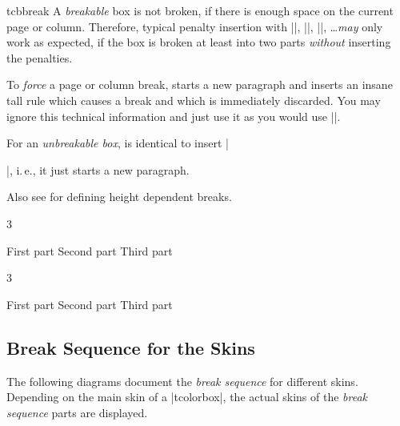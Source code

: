 \begin{docCommand}[doc new=2017-07-05]{tcbbreak}{}
  A \emph{breakable} box is not broken, if there is enough
  space on the current page or column.
  Therefore, typical penalty insertion with
  |\break|, |\pagebreak|, |\columnbreak|, \ldots \emph{may} only work as
  expected, if the box is broken at least into two parts
  \emph{without} inserting the penalties.\par\smallskip
  To \emph{force} a page or column break, 
  starts a new paragraph and inserts an insane tall rule which causes a
  break and which is immediately discarded. You may ignore this technical
  information and just use it as you would use |\pagebreak|.\par\smallskip
  For an \emph{unbreakable box},  is identical to insert |\par|,
  i.\,e., it just starts a new paragraph.\par\smallskip
  Also see  for defining height dependent breaks.

\begin{dispListing}
\begin{multicols}{3}
  \begin{tcolorbox}[breakable,enhanced jigsaw,size=small,
    colback=red!5!white,colframe=red!75!black,fonttitle=\bfseries,
    title=Break into parts
  ]
  First part\tcbbreak
  Second part\tcbbreak
  Third part
  \end{tcolorbox}
\end{multicols}

\begin{multicols}{3}
  \begin{tcolorbox}[enhanced jigsaw,size=small,
    colback=red!5!white,colframe=red!75!black,fonttitle=\bfseries,
    title=You shall not break
  ]
  First part\tcbbreak
  Second part\tcbbreak
  Third part
  \end{tcolorbox}
\end{multicols}

\end{dispListing}
{\tcbusetemp}

\end{docCommand}



\clearpage
\subsection{Break Sequence for the Skins}\label{subsec:breaksequence}
The following diagrams document the \emph{break sequence} for different
skins. Depending on the main skin of a |tcolorbox|, the actual skins of
the \emph{break sequence} parts are displayed.


